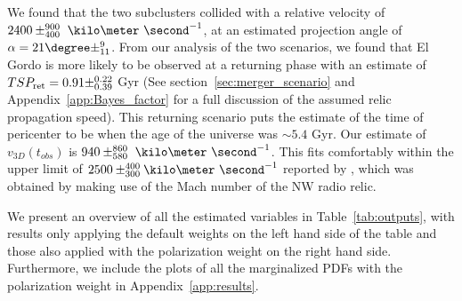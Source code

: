 \documentclass[letterpaper,useAMS,usenatbib]{mn2e}
\begin{document}
We found that the two subclusters collided with a relative velocity of $2400\pm^{900}_{400}~\kilo\meter~\second^{-1}$, at an estimated projection
angle of $\alpha = 21\degree\pm^{9}_{11}$. From our analysis of the two
scenarios, we found that El Gordo is more likely to be observed at a returning
phase with an estimate of $TSP_{\rm ret} = 0.91\pm^{0.22}_{0.39}$ Gyr
(See section~\ref{sec:merger_scenario} and Appendix~\ref{app:Bayes_factor}
for a full discussion of the assumed relic propagation speed). This
returning scenario puts the
estimate of the time of pericenter to be when the age of the universe was
$\sim5.4$ Gyr. 
Our estimate of $v_{3D}(t_{obs})$ is
$940\pm^{860}_{580}~\kilo\meter~\second^{-1}$. 
This fits comfortably within the upper limit of $2500
\pm^{400}_{300}\kilo\meter~\second^{-1}$ reported by \cite{L13},
which was obtained by making use of the Mach number of the NW radio relic.
\par
We present an
overview of all the estimated variables in Table~\ref{tab:outputs}, with
results only applying the default weights on the left hand side of the table
and those also applied with the polarization weight on the right hand side.
Furthermore, we include the plots of all the marginalized PDFs with the
polarization weight in Appendix~\ref{app:results}. 

\end{document}
